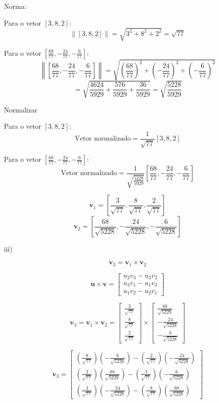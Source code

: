 Norma:

Para o vetor \( [3, 8, 2] \):
\[ \| [3, 8, 2] \| = \sqrt{3^2 + 8^2 + 2^2} = \sqrt{77} \]

Para o vetor \( \left[ \frac{68}{77}, -\frac{24}{77}, -\frac{6}{77} \right] \):
\[ \left\| \left[ \frac{68}{77}, -\frac{24}{77}, -\frac{6}{77} \right] \right\| = \sqrt{\left( \frac{68}{77} \right)^2 + \left( -\frac{24}{77} \right)^2 + \left( -\frac{6}{77} \right)^2} \]
\[ = \sqrt{\frac{4624}{5929} + \frac{576}{5929} + \frac{36}{5929}} = \sqrt{\frac{5228}{5929}} \]


Normalizar

Para o vetor \( [3, 8, 2] \):
\[ \text{Vetor normalizado} = \frac{1}{\sqrt{77}} [3, 8, 2] \]

Para o vetor \( \left[ \frac{68}{77}, -\frac{24}{77}, -\frac{6}{77} \right] \):
\[ \text{Vetor normalizado} = \frac{1}{\sqrt{\frac{5228}{5929}}} \left[ \frac{68}{77}, -\frac{24}{77}, -\frac{6}{77} \right] \]

\[ \mathbf{v}_1 = \left[ \frac{3}{\sqrt{77}}, \frac{8}{\sqrt{77}}, \frac{2}{\sqrt{77}} \right] \]
\[ \mathbf{v}_2 = \left[ \frac{68}{\sqrt{5228}}, -\frac{24}{\sqrt{5228}}, -\frac{6}{\sqrt{5228}} \right] \]

iii)

\[ \mathbf{v}_3 = \mathbf{v}_1 \times \mathbf{v}_2 \]

\[ \mathbf{u} \times \mathbf{v} = \begin{bmatrix} u_2 v_3 - u_3 v_2 \\ u_3 v_1 - u_1 v_3 \\ u_1 v_2 - u_2 v_1 \end{bmatrix} \]

\[ \mathbf{v}_3 = \mathbf{v}_1 \times \mathbf{v}_2 = \begin{bmatrix} \frac{3}{\sqrt{77}} \\ \frac{8}{\sqrt{77}} \\ \frac{2}{\sqrt{77}} \end{bmatrix} \times \begin{bmatrix} \frac{68}{\sqrt{5228}} \\ -\frac{24}{\sqrt{5228}} \\ -\frac{6}{\sqrt{5228}} \end{bmatrix} \]

\[ \mathbf{v}_3 = \begin{bmatrix} \left( \frac{8}{\sqrt{77}} \right) \left( -\frac{6}{\sqrt{5228}} \right) - \left( \frac{2}{\sqrt{77}} \right) \left( -\frac{24}{\sqrt{5228}} \right) \\ \left( \frac{2}{\sqrt{77}} \right) \left( \frac{68}{\sqrt{5228}} \right) - \left( \frac{3}{\sqrt{77}} \right) \left( -\frac{6}{\sqrt{5228}} \right) \\ \left( \frac{3}{\sqrt{77}} \right) \left( -\frac{24}{\sqrt{5228}} \right) - \left( \frac{8}{\sqrt{77}} \right) \left( \frac{68}{\sqrt{5228}} \right) \end{bmatrix} \]

